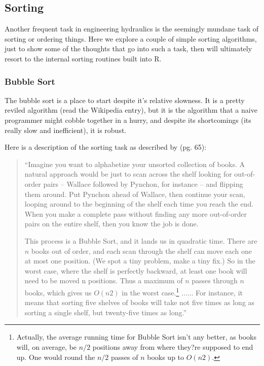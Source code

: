 \subsection{Sorting}
Another frequent task in engineering hydraulics is the seemingly mundane task of sorting or ordering things. 
Here we explore a couple of simple sorting algorithms, just to show some of the thoughts that go into such a task, then will ultimately resort to the internal sorting routines built into R.
\subsubsection{Bubble Sort}
The bubble sort is a place to start despite it's relative slowness.
It is a pretty reviled algorithm (read the Wikipedia entry), but it is the algorithm that a naive programmer might cobble together in a hurry, and despite its shortcomings (its really slow and inefficient), it is robust.

Here is a description of the sorting task as described by \cite{Christian2016} (pg. 65):
\begin{quote}
``Imagine you want to alphabetize your unsorted collection of books. A natural approach would be just to scan across the shelf looking for out-of-order pairs -- Wallace followed by Pynchon, for instance -- and flipping them around. Put Pynchon ahead of Wallace, then continue your scan, looping around to the beginning of the shelf each time you reach the end. When you make a complete pass without finding any more out-of-order pairs on the entire shelf, then you know the job is done.

This process is a Bubble Sort, and it lands us in quadratic time. There are $n$ books out of order, and each scan through the shelf can move each one at most one position. (We spot a tiny problem, make a tiny fix.) So in the worst case, where the shelf is perfectly backward, at least one book will need to be moved n positions. Thus a maximum of $n$ passes through $n$ books, which gives us $O(n2)$ in the worst case.\footnote{Actually, the average running time for Bubble Sort isn't any better, as books will, on average, be $n/2$ positions away from where they?re supposed to end up. One would round the $n/2$ passes of $n$ books up to $O(n2)$.}
$\dots \dots$  For instance, it means that sorting five shelves of books will take not five times as long as sorting a single shelf, but twenty-five times as long.''
\end{quote}

